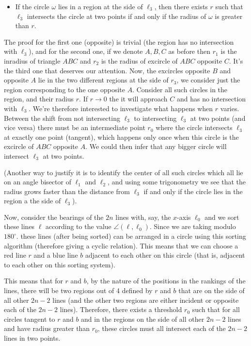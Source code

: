 \documentclass[11pt,a4paper]{article}
\begin{document}
\begin{enumerate}
\begin{itemize}
		\item If the circle $\omega$ lies in a region at the side of $\ell_3$, then there exists $r$ such that $\ell_3$ intersects the circle at two points if and only if the radius of $\omega$ is greater than $r$. 
	\end{itemize}
	The proof for the first one (opposite) is trivial (the region has no intersection with $\ell_3$), and for the second one, if we denote $A, B, C$ as before then $r_1$ is the inradius of triangle $ABC$ and $r_2$ is the radius of excircle of $ABC$ opposite $C$. It's the third one that deserves our attention. Now, the excircles opposite $B$ and opposite $A$ lie in the two different regions at the side of $r_3$, we consider just the region corresponding to the one opposite $A$. Consider all such circles in the region, and their radius $r$. 
	If $r\to 0$ the it will approach $C$ and has no intersection with $\ell_3$. We're therefore interested to investigate what happens when $r$ varies. Between the shift from not intersecting $\ell_3$ to intersecting $\ell_3$ at two points (and vice versa) there must be an intermediate point $r_0$ where the circle intersects $\ell_3$ at exactly one point (tangent), which happens only once when this circle is the excircle of $ABC$ opposite $A$. We could then infer that any bigger circle will intersect $\ell_3$ at two points. 
	
	(Another way to justify it is to identify the center of all such circles which all lie on an angle bisector of $\ell_1$ and $\ell_2$, and using some trigonometry we see that the radius grows faster than the distance from $\ell_3$ if and only if the circle lies in the region a the side of $\ell_3$). 
	
	Now, consider the bearings of the $2n$ lines with, say, the $x$-axis $\ell_0$ and we sort these lines $\ell$ according to the value $\angle(\ell, \ell_0)$. Since we are taking modulo $180^{\circ}$. these lines (after being sorted) can be arranged in a circle using this sorting algorithm (therefore giving a cyclic relation). This means that we can choose a red line $r$ and a blue line $b$ adjacent to each other on this circle (that is, adjacent to each other on this sorting system). 
	
	This means that for $r$ and $b$, by the nature of the positions in the rankings of the lines, there will be two regions out of 4 defined by $r$ and $b$ that are on the side of all other $2n-2$ lines (and the other two regions are either incident or opposite each of the $2n-2$ lines). Therefore, there exists a threshold $r_0$ such that for all circles tangent to $r$ and $b$ and in the regions on the side of all other $2n-2$ lines and have radius greater than $r_0$, these circles must all intersect each of the $2n-2$ lines in two points. 
	

\end{enumerate}
\end{document}
